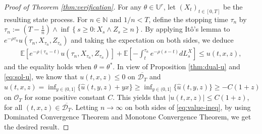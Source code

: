 \documentclass[11pt,times,letter]{article}
\newcommand{\Ex}{ \mathbb{E} }
\newcommand{\R}{\mathds{R}}
\numberwithin{equation}{section}
\begin{document}
\begin{proof}[Proof of Theorem \ref{thm:verification}]
 For any $\theta\in \mathbb{U}^r$, let $(X_t)_{t\in[ 0,T]}$ be the resulting state process. For $n\in \mathbb{N}$ and $1/n<T$, define the stopping time $\tau_n$ by $\tau_n:=\left(T-\frac{1}{n}\right)\wedge\inf \left\{s\geq 0: X_s \wedge Z_s\geq n\right\}$. By applying It\^o's lemma to $e^{-\rho \tau_n}u(\tau_n,X_{\tau_n},Z_{\tau_n})$ and  taking the expectation on both sides, we deduce
\begin{align}\label{eq:value-ineq}
\Ex\left[e^{-\rho (\tau_n-t)}u(\tau_n,X_{\tau_n},Z_{\tau _n})\right]+\mathbb{E}\left[-\int_t^{\tau_n}e^{-\rho (s-t)}dL_s^X\right]\leq u(t,x,z),
\end{align}
and the equality holds when $\theta=\theta^*$. In view of Proposition \ref{thm:dual-u} and \eqref{eq:sol-u}, we know that $u(t,x,z)\leq 0$ on $\overline{\mathcal{D}_T}$ and $u(t,x,z)=\inf_{y\in(0,1]}\{\hat{u}(t,y,z)+yx\}\geq \inf_{y\in(0,1]}\{\hat{u}(t,y,z)\}\geq -C(1+z)$ on $\mathcal{O}_T$ for some positive constant $C$. This yields that $|u(t,x,z)|\leq C(1+z)$, for all $(t,x,z)\in\overline{\mathcal{D}_T}$.  Letting $n \rightarrow \infty$ on both sides of \eqref{eq:value-ineq}, by using Dominated Convergence Theorem and  Monotone Convergence Theorem, we get the desired result.
\end{proof}

\end{document}
